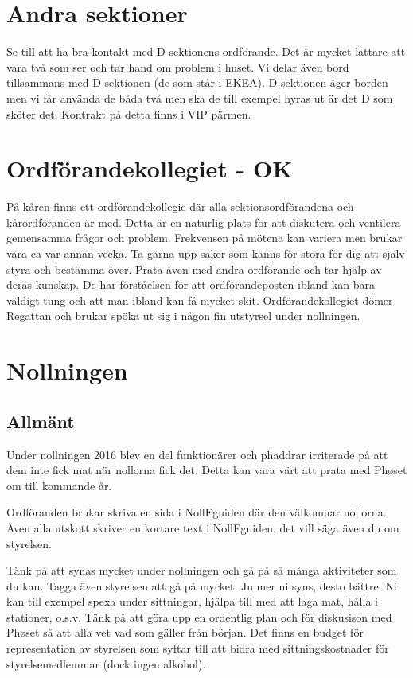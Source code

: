 \documentclass[10pt]{article}
\begin{document}
    \section{Andra sektioner}
    
    Se till att ha bra kontakt med D-sektionens ordförande. Det är mycket lättare att vara två som ser och tar hand om problem i huset. Vi delar även bord tillsammans med D-sektionen (de som står i EKEA). D-sektionen äger borden men vi får använda de båda två men ska de till exempel hyras ut är det D som sköter det. Kontrakt på detta finns i VIP pärmen.
    
    \section{Ordförandekollegiet - OK}
    
    På kåren finns ett ordförandekollegie där alla sektionsordförandena och kårordföranden är med. Detta är en naturlig plats för att diskutera och ventilera gemensamma frågor och problem. Frekvensen på mötena kan variera men brukar vara ca var annan vecka. Ta gärna upp saker som känns för stora för dig att själv styra och bestämma över. Prata även med andra ordförande och tar hjälp av deras kunskap. De har förståelsen för att ordförandeposten ibland kan bara väldigt tung och att man ibland kan få mycket skit.
    Ordförandekollegiet dömer Regattan och brukar spöka ut sig i någon fin utstyrsel under nollningen.
    
    \section{Nollningen}
    
    \subsection{Allmänt}
    
    Under nollningen 2016 blev en del funktionärer och phaddrar irriterade på att dem inte fick mat när nollorna fick det. Detta kan vara värt att prata med Ph\o set om till kommande år.
    
    Ordföranden brukar skriva en sida i NollEguiden där den välkomnar nollorna. Även alla utskott skriver en kortare text i NollEguiden, det vill säga även du om styrelsen.
    
    Tänk på att synas mycket under nollningen och gå på så många aktiviteter som du kan. Tagga även styrelsen att gå på mycket. Ju mer ni syns, desto bättre. Ni kan till exempel spexa under sittningar, hjälpa till med att laga mat, hålla i stationer, o.s.v. Tänk på att göra upp en ordentlig plan och för diskusison med Ph\o set så att alla vet vad som gäller från början. Det finns en budget för representation av styrelsen som syftar till att bidra med sittningskostnader för styrelsemedlemmar (dock ingen alkohol).
    
\end{document}
